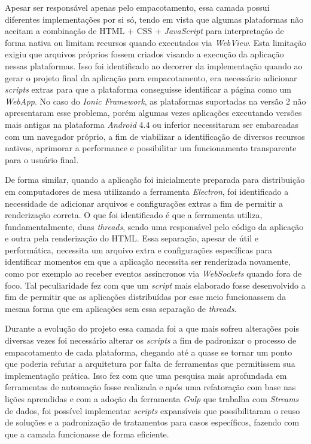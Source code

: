 Apesar ser responsável apenas pelo empacotamento, essa camada possui diferentes implementações por si só, tendo em vista que algumas plataformas não aceitam a combinação de HTML + CSS + \textit{JavaScript} para interpretação de forma nativa ou limitam recursos quando executados via \textit{WebView}. Esta limitação exigiu que arquivos próprios fossem criados visando a execução da aplicação nessas plataformas. Isso foi identificado ao decorrer da implementação quando ao gerar o projeto final da aplicação para empacotamento, era necessário adicionar \textit{scripts} extras para que a plataforma conseguisse identificar a página como um \textit{WebApp}. No caso do \textit{Ionic Framework}, as plataformas suportadas na versão 2 não apresentaram esse problema, porém algumas vezes aplicações executando versões mais antigas na plataforma \textit{Android} 4.4 ou inferior necessitaram ser embarcadas com um navegador próprio, a fim de viabilizar a identificação de diversos recursos nativos, aprimorar a performance e possibilitar um funcionamento transparente para o usuário final.

De forma similar, quando a aplicação foi inicialmente preparada para distribuição em computadores de mesa utilizando a ferramenta \textit{Electron}, foi identificado a necessidade de adicionar arquivos e configurações extras a fim de permitir a renderização correta. O que foi identificado é que a ferramenta utiliza, fundamentalmente, duas \textit{threads}, sendo uma responsável pelo código da aplicação e outra pela renderização do HTML. Essa separação, apesar de útil e performática, necessita um arquivo extra e configurações específicas para identificar momentos em que a aplicação necessita ser renderizada novamente, como por exemplo ao receber eventos assíncronos via \textit{WebSockets} quando fora de foco. Tal peculiaridade fez com que um \textit{script} mais elaborado fosse desenvolvido a fim de permitir que as aplicações distribuídas por esse meio funcionassem da mesma forma que em aplicações sem essa separação de \textit{threads}.

Durante a evolução do projeto essa camada foi a que mais sofreu alterações pois diversas vezes foi necessário alterar os \textit{scripts} a fim de padronizar o processo de empacotamento de cada plataforma, chegando até a quase se tornar um ponto que poderia refutar a arquitetura por falta de ferramentas que permitissem sua implementação prática. Isso fez com que uma pesquisa mais aprofundada em ferramentas de automação fosse realizada e após uma refatoração com base nas lições aprendidas e com a adoção da ferramenta \textit{Gulp} que trabalha com \textit{Streams} de dados, foi possível implementar \textit{scripts} expansíveis que possibilitaram o reuso de soluções e a padronização de tratamentos para casos específicos, fazendo com que a camada funcionasse de forma eficiente.


